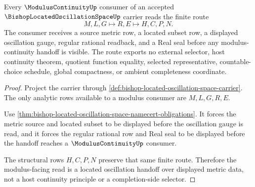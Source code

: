 \begin{theorem}
\label{thm:bishop-located-oscillation-space-modulus-route}
Every $\ModulusContinuityUp$ consumer of an accepted $\BishopLocatedOscillationSpaceUp$ carrier reads the finite route
$$
M,L,G \longmapsto R,E \longmapsto H,C,P,N .
$$
The consumer receives a source metric row, a located subset row, a displayed oscillation gauge, regular rational readback, and a Real seal before any modulus-continuity handoff is visible. The route exports no external selector, host continuity theorem, quotient function equality, selected representative, countable-choice schedule, global compactness, or ambient completeness coordinate.
\end{theorem}
\begin{proof}
Project the carrier through \autoref{def:bishop-located-oscillation-space-carrier}. The only analytic rows available to a modulus consumer are $M,L,G,R,E$.

Use \autoref{thm:bishop-located-oscillation-space-namecert-obligations}. It forces the metric source and located subset to be displayed before the oscillation gauge is read, and it forces the regular rational row and Real seal to be displayed before the handoff reaches a $\ModulusContinuityUp$ consumer.

The structural rows $H,C,P,N$ preserve that same finite route. Therefore the modulus-facing read is a located oscillation handoff over displayed metric data, not a host continuity principle or a completion-side selector.
\end{proof}


\begin{closurestatus}{\BishopLocatedOscillationSpaceUp}
  \theoryclosure{\seedClosure}
  \formalstatus{\unformalizedV}
\end{closurestatus}
